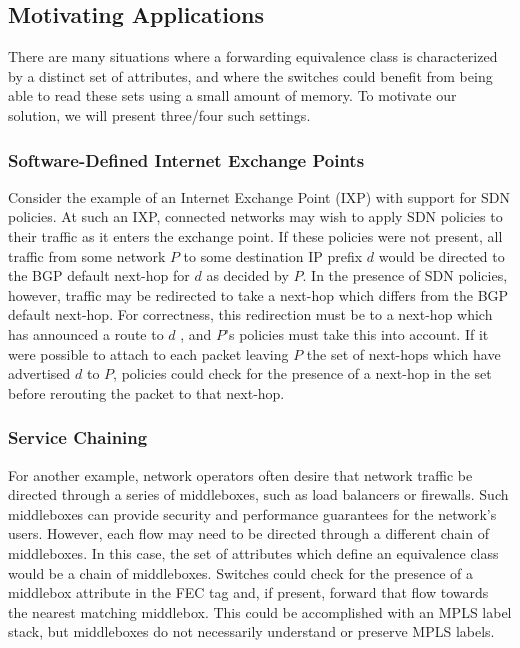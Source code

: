 \begin{itemize}
{\subsection{Motivating Applications}
There are many situations where a forwarding equivalence class is characterized by a distinct set of attributes, and where the switches could benefit from being able to read these sets using a small amount of memory. To motivate our solution, we will present three/four such settings. 

\subsubsection{Software-Defined Internet Exchange Points}
Consider the example of an Internet Exchange Point (IXP) with support for SDN policies. At such an IXP, connected networks may wish to apply SDN policies to their traffic as it enters the exchange point. If these policies were not present, all traffic from some network $P$  to some destination IP prefix $d$ would be directed to the BGP default next-hop for $d$ as decided by $P$. In the presence of SDN policies, however, traffic may be redirected to take a next-hop which differs from the BGP default next-hop. For correctness, this redirection must be to a next-hop which has announced a route to $d$ , and $P$'s policies must take this into account. If it were possible to attach to each packet leaving $P$ the set of next-hops which have advertised $d$ to $P$, policies could check for the presence of a next-hop in the set before rerouting the packet to that next-hop. 

\subsubsection{Service Chaining}
For another example, network operators often desire that network traffic be directed through a series of middleboxes, such as load balancers or firewalls. Such middleboxes can provide security and performance guarantees for the network's users. However, each flow may need to be directed through a different chain of middleboxes. In this case, the set of attributes which define an equivalence class would be a chain of middleboxes. Switches could check for the presence of a middlebox attribute in the FEC tag and, if present, forward that flow towards the nearest matching middlebox. This could be accomplished with an MPLS label stack, but middleboxes do not necessarily understand or preserve MPLS labels. 

}
\end{itemize}

